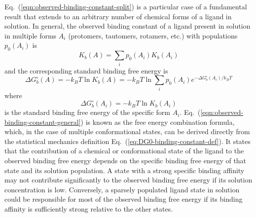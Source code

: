 \documentclass[9pt,bestpractices,pubversion]{livecoms}
\begin{document}
Eq.~(\ref{eqn:observed-binding-constant-split}) is a particular case of a fundamental result that extends to an arbitrary number of chemical forms of a ligand in solution. In general, the observed binding constant of a ligand present in solution in multiple forms $A_i$ (protomers, tautomers, rotamers, etc.) with populations $p_0(A_i)$ is\cite{khuttan2023taming}
\begin{equation}
  K_b(A) = \sum_i p_0(A_i) K_b(A_i)
  \label{eqn:observed-binding-constant-general}
\end{equation}
and the corresponding standard binding free energy is
\begin{equation}
 \Delta G^\circ_b(A) = -k_B T \ln K_b(A) = -k_B T \ln \sum_i p_0(A_i) e^{-\Delta G^\circ_b(A_i)/k_B T}
  \label{eqn:observed-binding-free-energy-general}
\end{equation}
where
\begin{equation}
\Delta G^\circ_b(A_i) = -k_B T \ln K_b(A_i)
\end{equation}
is the standard binding free energy of the specific form $A_i$. Eq.~(\ref{eqn:observed-binding-constant-general}) is known as the free energy combination formula, which, in the case of multiple conformational states, can be derived directly from the statistical mechanics definition Eq.~(\ref{eq:DG0-binding-constant-def}).\cite{jayachandran2006parallelized,gallicchio2011recent} It states that the contribution of a chemical or conformational state of the ligand to the observed binding free energy depends on the specific binding free energy of that state and its solution population. A state with a strong specific binding affinity may not contribute significantly to the observed binding free energy if its solution concentration is low. Conversely, a sparsely populated ligand state in solution could be responsible for most of the observed binding free energy if its binding affinity is sufficiently strong relative to the other states.\cite{azimi2022application}   
\end{document}
